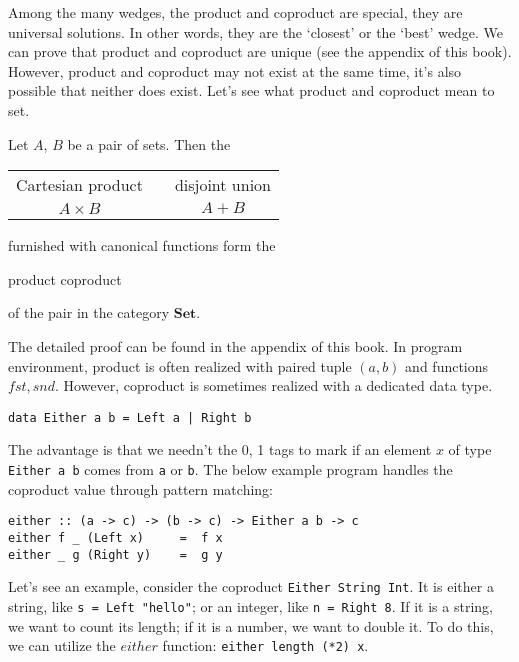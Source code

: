 \documentclass{article}
\begin{document}
Among the many wedges, the product and coproduct are special, they are universal solutions. In other words, they are the `closest' or the `best' wedge. We can prove that product and coproduct are unique (see the appendix of this book). However, product and coproduct may not exist at the same time, it's also possible that neither does exist. Let's see what product and coproduct mean to set.

\begin{lemma}
\normalfont
Let $A$, $B$ be a pair of sets. Then the

\begin{center}
\begin{tabular}{ccc}
Cartesian product & \quad \quad \quad & disjoint union \\
$A \times B$ & \quad \quad \quad & $A + B$ \\
\end{tabular}
\end{center}

furnished with canonical functions form the

\begin{center}
product \quad \quad \quad coproduct
\end{center}

of the pair in the category $\pmb{Set}$.
\end{lemma}

The detailed proof can be found in the appendix of this book. In program environment, product is often realized with paired tuple $(a, b)$ and functions $fst, snd$. However, coproduct is sometimes realized with a dedicated data type.

\lstset{frame = single}
\begin{lstlisting}
data Either a b = Left a | Right b
\end{lstlisting}

The advantage is that we needn't the 0, 1 tags to mark if an element $x$ of type \texttt{Either a b} comes from \texttt{a} or \texttt{b}. The below example program handles the coproduct value through pattern matching:

\begin{lstlisting}
either :: (a -> c) -> (b -> c) -> Either a b -> c
either f _ (Left x)     =  f x
either _ g (Right y)    =  g y
\end{lstlisting}
\lstset{frame = none}

Let's see an example, consider the coproduct \texttt{Either String Int}. It is either a string, like \texttt{s = Left "hello"}; or an integer, like \texttt{n = Right 8}. If it is a string, we want to count its length; if it is a number, we want to double it. To do this, we can utilize the $either$ function: \texttt{either length (*2) x}.
\end{document}
